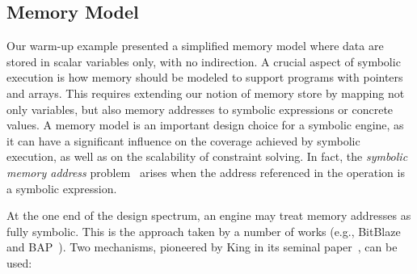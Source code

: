 
\subsection{Memory Model}
\label{ss:memory}


Our warm-up example presented a simplified memory model where data are stored in scalar variables only, with no indirection. A crucial aspect of symbolic execution is how memory should be modeled to support programs with pointers and arrays. This requires extending our notion of memory store by mapping not only variables, but also memory addresses to symbolic expressions or concrete values.
A memory model is an important design choice for a symbolic engine, as it can have a significant influence on the coverage achieved by symbolic execution, as well as on the scalability of constraint solving. In fact, the {\em symbolic memory address} problem~\cite{SAB-SP10}  arises when the address referenced in the operation is a symbolic expression.

 At the one end of the design spectrum, an engine may treat memory addresses as fully symbolic. This is the approach taken by a number of works (e.g., {\sc BitBlaze}~\cite{BITBLAZE-ICISS08} and {\sc BAP}~\cite{BAP-CAV11}). Two mechanisms, pioneered by King in its seminal paper~\cite{K-CACM76}, can be used:

